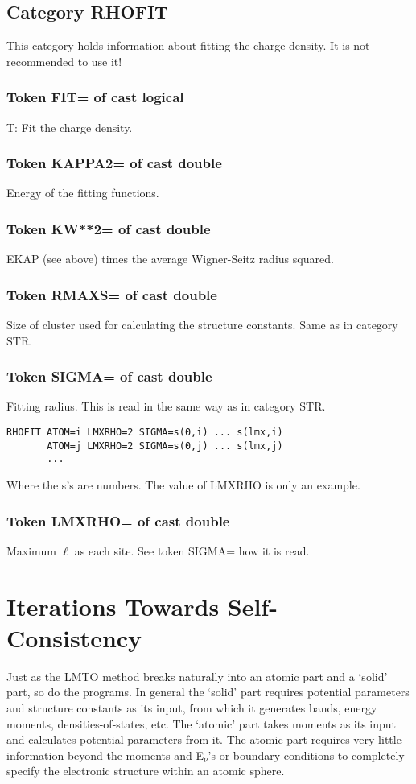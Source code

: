 \documentclass[aps,twocolumn,a4]{revtex4}
\begin{document}
\subsection{Category RHOFIT}
This category holds information about fitting the charge density. It is
not recommended to use it!

\subsubsection{Token FIT= of cast logical}
T: Fit the charge density.

\subsubsection{Token KAPPA2= of cast double}
Energy of the fitting functions.

\subsubsection{Token KW**2= of cast double}
EKAP (see above) times the average Wigner-Seitz radius squared.

\subsubsection{Token RMAXS= of cast double}
Size of cluster used for calculating the structure constants. Same as
in category STR.

\subsubsection{Token SIGMA= of cast double}
Fitting radius. This is read in the same way as in category STR.
\begin{verbatim}
RHOFIT ATOM=i LMXRHO=2 SIGMA=s(0,i) ... s(lmx,i)
       ATOM=j LMXRHO=2 SIGMA=s(0,j) ... s(lmx,j)
       ...
\end{verbatim}
Where the s's are numbers. The value of LMXRHO is only an example.

\subsubsection{Token LMXRHO= of cast double}
Maximum $\ell $ as each site. See token SIGMA= how it is read.


%
\section{Iterations Towards Self-Consistency }
\label{iter}
Just as the LMTO method breaks naturally into an atomic part and a
`solid' part, so do the programs.  In general the `solid' part requires
potential parameters and structure constants as its input, from which it
generates bands, energy moments, densities-of-states, etc.  The `atomic'
part takes moments as its input and calculates potential parameters from
it.  The atomic part requires very little information beyond the moments
and E$_\nu $'s or boundary conditions to completely specify the
electronic structure within an atomic sphere.
\end{document}
